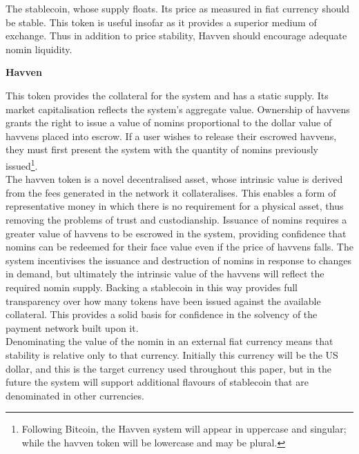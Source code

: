 \noindent The stablecoin, whose supply floats. Its price as measured in fiat
currency should be stable. This token is useful insofar as it provides a
superior medium of exchange. Thus in addition to price stability, Havven
should encourage adequate nomin liquidity.

\vspace{2mm}

\noindent \textbf{Havven}

\vspace{1mm}

\noindent This token provides the collateral for the system and has a static
supply. Its market capitalisation reflects the system’s aggregate value.
Ownership of havvens grants the right to issue a value of nomins proportional
to the dollar value of havvens placed into escrow. If a user wishes to
release their escrowed havvens, they must first present the system with the
quantity of nomins previously issued\footnote{Following Bitcoin, the Havven
system will appear in uppercase and singular; while the havven token will be
lowercase and may be plural.}. \\

\noindent The havven token is a novel decentralised asset, whose intrinsic
value is derived from the fees generated in the network it collateralises.
This enables a form of representative money in which there is no requirement
for a physical asset, thus removing the problems of trust and custodianship.
Issuance of nomins requires a greater value of havvens to be escrowed in the
system, providing confidence that nomins can be redeemed for their face value
even if the price of havvens falls. The system incentivises the issuance and
destruction of nomins in response to changes in demand, but ultimately the
intrinsic value of the havvens will reflect the required nomin supply.
Backing a stablecoin in this way provides full transparency over how many
tokens have been issued against the available collateral. This provides a
solid basis for confidence in the solvency of the payment network built upon
it.\\

\noindent Denominating the value of the nomin in an external fiat currency
means that stability is relative only to that currency. Initially this
currency will be the US dollar, and this is the target currency used throughout
this paper, but in the future the system will support additional flavours
of stablecoin that are denominated in other currencies.
\pagebreak
